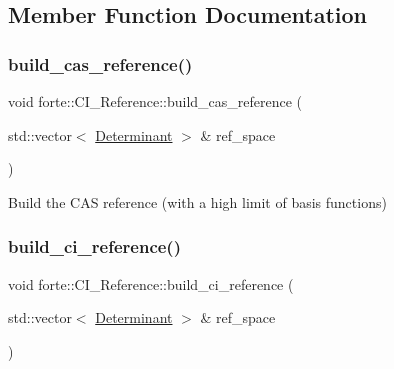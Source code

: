 \subsection{Member Function Documentation}
\mbox{\label{classforte_1_1_c_i___reference_a9f2dad6f5ae3ece6d385a519b2a98d12}} 
\subsubsection{\texorpdfstring{build\+\_\+cas\+\_\+reference()}{build\_cas\_reference()}}
{\footnotesize\ttfamily void forte\+::\+C\+I\+\_\+\+Reference\+::build\+\_\+cas\+\_\+reference (\begin{DoxyParamCaption}\item[{std\+::vector$<$ \mbox{\hyperlink{namespaceforte_a2076c63fd7b8732004d9e1442ce527c1}{Determinant}} $>$ \&}]{ref\+\_\+space }\end{DoxyParamCaption})}



Build the C\+AS reference (with a high limit of basis functions) 

\mbox{\label{classforte_1_1_c_i___reference_a69d5e58e9a4721950b81b930aad9afb3}} 
\subsubsection{\texorpdfstring{build\+\_\+ci\+\_\+reference()}{build\_ci\_reference()}}
{\footnotesize\ttfamily void forte\+::\+C\+I\+\_\+\+Reference\+::build\+\_\+ci\+\_\+reference (\begin{DoxyParamCaption}\item[{std\+::vector$<$ \mbox{\hyperlink{namespaceforte_a2076c63fd7b8732004d9e1442ce527c1}{Determinant}} $>$ \&}]{ref\+\_\+space }\end{DoxyParamCaption})\hspace{0.3cm}{\ttfamily [protected]}}

